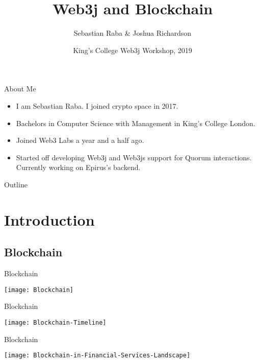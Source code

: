\documentclass{beamer}
\title{Web3j and Blockchain}
\author{Sebastian Raba \& Joshua Richardson}
\institute[] %
{
  Blockchain Platform Engineers\\
  Web3 Labs
}
\date{King's College Web3j Workshop, 2019}
\begin{document}
\begin{frame}
  \titlepage
\end{frame}

\begin{frame}{About Me}
	\begin{itemize}
		\item {
		I am Sebastian Raba. I joined crypto space in 2017.
		}
		\item {
			Bachelors in Computer Science with Management in King’s College London. 
		}
		\item {
		Joined Web3 Labs a year and a half ago.
		}
		\item {
		Started off developing Web3j and Web3js support for Quorum interactions. Currently working on  Epirus’s backend. 
		}
	\end{itemize}
\end{frame}

\begin{frame}{Outline}
  \tableofcontents
\end{frame}

\section{Introduction}

\subsection{Blockchain}

\begin{frame}{Blockchain}
	\begin{center}
		\texttt{[image: Blockchain]}
	\end{center}
\end{frame}

\begin{frame}{Blockchain}
	\begin{center}
		\texttt{[image: Blockchain-Timeline]}
	\end{center}
\end{frame}

\begin{frame}{Blockchain}
	\begin{center}
		\texttt{[image: Blockchain-in-Financial-Services-Landscape]}
	\end{center}
\end{frame}
\end{document}
